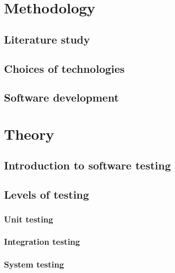 \documentclass[a4paper]{report}
\begin{document}
\chapter{Methodology}
  

  \section{Literature study}
  

  \section{Choices of technologies}
  

  \section{Software development}
  


\chapter{Theory}
\label{chap:theory}

  \section{Introduction to software testing}
    

  \section{Levels of testing}
    

    \subsection{Unit testing}
    \label{sec:unit_testing}
    

    \subsection{Integration testing}
    \label{sec:integration_testing}
    

    \subsection{System testing}
    
\end{document}

